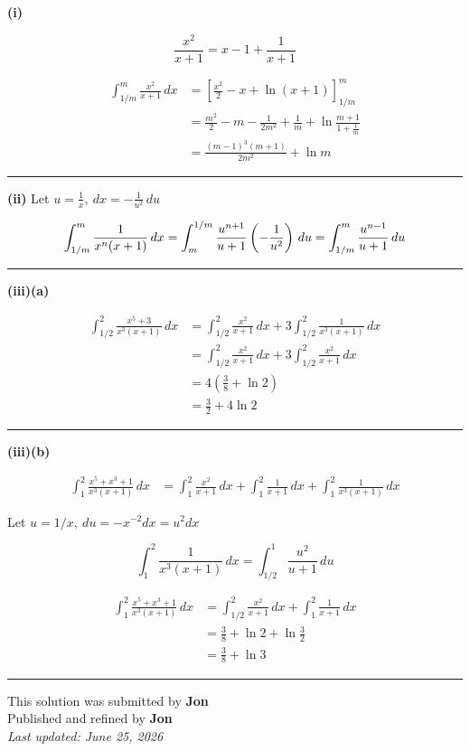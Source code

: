 \documentclass[12pt]{article}
\begin{document}
\newcommand{\ds}{\displaystyle}

\textbf{(i)}

$$\frac{x^2}{x+1}=x-1+\frac1{x+1}$$

\begin{align*}
\int_{1/m}^{m}\frac{x^2}{x+1}\,dx
&=\left[\frac{x^2}{2}-x+\ln(x+1)\right]_{1/m}^{m}\\
&=\frac{m^2}{2}-m-\frac1{2m^2}+\frac1m+\ln\frac{m+1}{1+\frac1m}\\
&=\frac{(m-1)^3(m+1)}{2m^2}+\ln m
\end{align*}

\bigskip\hrule\bigskip

\textbf{(ii)} Let $\ds u=\frac1x,\ dx=-\frac1{u^2}\,du$

$$\int_{1/m}^{m}\frac{1}{x^n(x+1)}\,dx=\int_{m}^{1/m}\frac{u^{n+1}}{u+1}\left(-\frac1{u^2}\right)\,du\\=\int_{1/m}^{m}\frac{u^{n-1}}{u+1}\,du$$


\bigskip\hrule\bigskip

\textbf{(iii)(a)}

\begin{align*}
\int_{1/2}^{2}\frac{x^5+3}{x^3(x+1)}\,dx
&=\int_{1/2}^{2}\frac{x^2}{x+1}\,dx
+3\int_{1/2}^{2}\frac1{x^3(x+1)}\,dx\\
&=\int_{1/2}^{2}\frac{x^2}{x+1}\,dx
+3\int_{1/2}^{2}\frac{x^2}{x+1}\,dx\\
&=4\left(\frac38+\ln2\right)\\
&=\frac32+4\ln2
\end{align*}

\bigskip\hrule\bigskip

\textbf{(iii)(b)}

\begin{align*}
\int_{1}^{2}\frac{x^5+x^3+1}{x^3(x+1)}\,dx
&=\int_{1}^{2}\frac{x^2}{x+1}\,dx
+\int_{1}^{2}\frac1{x+1}\,dx
+\int_{1}^{2}\frac1{x^3(x+1)}\,dx
\end{align*}

Let $u=1/x,\  du=-x^{-2}dx=u^2dx$

$$\int_{1}^{2}\frac1{x^3(x+1)}\,dx=\int_{1/2}^{1}\frac{u^2}{u+1}\,du$$

\begin{align*}
\int_{1}^{2}\frac{x^5+x^3+1}{x^3(x+1)}\,dx
&=\int_{1/2}^{2}\frac{x^2}{x+1}\,dx+\int_{1}^{2}\frac1{x+1}\,dx\\
&=\frac38+\ln2+\ln\frac32\\
&=\frac38+\ln3
\end{align*}

\bigskip
\hrule
\begin{center}
    This solution was submitted by \textbf{Jon}\\[4pt]
    Published and refined by \textbf{Jon}\\[8pt]
    \textit{Last updated: June 25, 2026}
\end{center}
\end{document}
